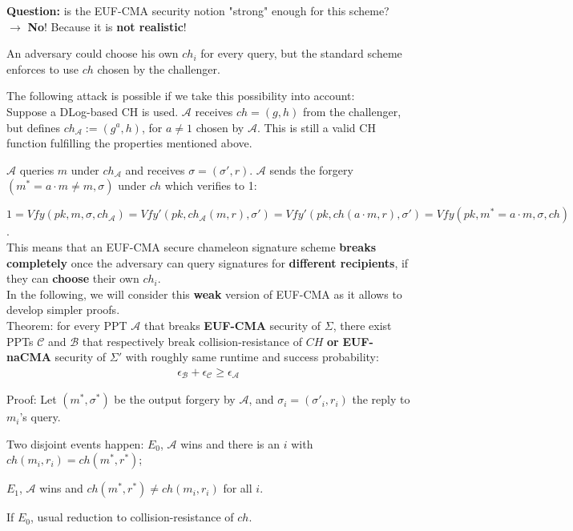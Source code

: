 \documentclass[oneside]{book}
\newcommand{\cA}[0]{\mathcal{A}}
\newcommand{\cB}[0]{\mathcal{B}}
\newcommand{\cC}[0]{\mathcal{C}}
\newcommand{\epsA}[0]{\epsilon_\cA}
\newcommand{\epsB}[0]{\epsilon_\cB}
\newcommand{\epsC}[0]{\epsilon_\cC}
\begin{document}
\textbf{Question:} is the EUF-CMA security notion "strong" enough for this scheme? $\rightarrow$ \textbf{No}! Because it is \textbf{not realistic}!

An adversary could choose his own $ch_i$ for every query, but the standard scheme enforces to use $ch$ chosen by the challenger.

The following attack is possible if we take this possibility into account:\\

Suppose a DLog-based CH is used. $\cA$ receives $ch = (g,h)$ from the challenger, but defines $ch_\cA := (g^a, h)$, for $a \neq 1$ chosen by $\cA$. This is still a valid CH function fulfilling the properties mentioned above.

$\cA$ queries $m$ under $ch_\cA$ and receives $\sigma = (\sigma', r)$. $\cA$ sends the forgery $(m^* = a \cdot m \neq m, \sigma)$ under $ch$ which verifies to 1:

$1 = Vfy(pk, m, \sigma, ch_\cA) = Vfy'(pk, ch_\cA(m,r), \sigma') = Vfy'(pk, ch(a \cdot m, r), \sigma') = Vfy(pk, m^* = a \cdot m, \sigma, ch)$.\\

This means that an EUF-CMA secure chameleon signature scheme \textbf{breaks completely} once the adversary can query signatures for \textbf{different recipients}, if they can \textbf{choose} their own $ch_i$.\\

In the following, we will consider this \textbf{weak} version of EUF-CMA as it allows to develop simpler proofs.\\

Theorem: for every PPT $\cA$ that breaks \textbf{EUF-CMA} security of $\Sigma$, there exist PPTs $\cC$ and $\cB$ that respectively break collision-resistance of $CH$ \textbf{or} \textbf{EUF-naCMA} security of $\Sigma'$ with roughly same runtime and success probability:
\begin{align}
    \epsB + \epsC \ge \epsA
\end{align}

Proof: Let $(m^*, \sigma^*)$ be the output forgery by $\cA$, and $\sigma_i = (\sigma'_i, r_i)$ the reply to $m_i$'s query.

Two disjoint events happen: $E_0$, $\cA$ wins and there is an $i$ with $ch(m_i, r_i) = ch(m^*, r^*)$;

$E_1$, $\cA$ wins and $ch(m^*,r^*) \neq ch(m_i, r_i)$ for all $i$.

If $E_0$, usual reduction to collision-resistance of $ch$.\\
\end{document}
